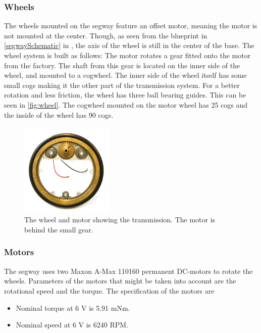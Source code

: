 \subsubsection{Wheels}
\label{subsec:wheels}
The wheels mounted on the segway feature an offset motor, meaning the motor is not mounted at the center. Though, as seen from the blueprint in \autoref{segwaySchematic} in , the axis of the wheel is still in the center of the base. The wheel system is built as follows: The motor rotates a gear fitted onto the motor from the factory. The shaft from this gear is located on the inner side of the wheel, and mounted to a cogwheel. The inner side of the wheel itself has some small cogs making it the other part of the transmission system.
For a better rotation and less friction, the wheel has three ball bearing guides. This can be seen in \autoref{fig:wheel}.
The cogwheel mounted on the motor wheel has 25 cogs and the inside of the wheel has 90 cogs.

\begin{figure}[H]
\centering
\includegraphics[width=0.4\textwidth]{figures/wheel.jpg}
\caption{The wheel and motor showing the transmission. The motor is behind the small gear.}
\label{fig:wheel}
\end{figure}

\subsubsection{Motors}
\label{subsec:motors}
The segway uses two Maxon A-Max 110160 permanent DC-motors to rotate the wheels. Parameters of the motors that might be taken into account are the rotational speed and the torque. The specification of the motors are \citep{maxon}
\begin{itemize}
\item Nominal torque at {6 V} is 5.91 mNm.
\item Nominal speed at {6 V} is 6240 RPM.
\end{itemize}

